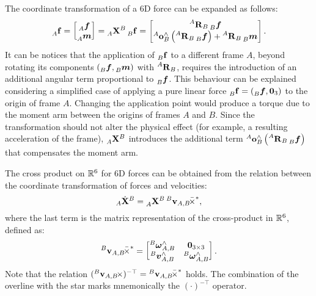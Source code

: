 \begin{addmargin}{0cm}
\begin{remark*}
%
The coordinate transformation of a 6D force can be expanded as follows:
%
\begin{equation*}
    \forcesix[A]
    = \begin{bmatrix}
        \forcelin[A] \\ \forceang[A]
    \end{bmatrix}
    = \transfor[A]^B \forcesix[B]
    = \begin{bmatrix}
        \rot[A]_B \forcelin[B] \\
        \ori[A]_B^\wedge \left( \rot[A]_B \forcelin[B] \right) + \rot[A]_B \forceang[B]
    \end{bmatrix}
    .
\end{equation*}
%
It can be notices that the application of $\forcesix[B]$ to a different frame $A$, beyond rotating its components $(\forcelin[B], \forceang[B])$ with $\rot[A]_B$, requires the introduction of an additional angular term proportional to $\forcelin[B]$.
This behaviour can be explained considering a simplified case of applying a pure linear force $\forcesix[B] = (\forcelin[B], \zeros_3)$ to the origin of frame $A$.
Changing the application point would produce a torque due to the moment arm between the origins of frames $A$ and $B$.
Since the transformation should not alter the physical effect (for example, a resulting acceleration of the frame), $\transfor[A]^B$ introduces the additional term $\ori[A]_B^\wedge \left( \rot[A]_B \forcelin[B] \right)$ that compensates the moment arm.
%
\end{remark*}

The cross product on $\realn^6$ for 6D forces can be obtained from the relation between the coordinate transformation of forces and velocities:
%
\begin{equation*}
    {}_A \dot{\mathbf{X}}^B = \transfor[A]^B \crossforsix[{\velsix[B]_{A,B}}]
    ,
\end{equation*}
%
where the last term is the matrix representation of the cross-product in $\realn^6$, defined as:
%
\begin{equation*}
    \crossforsix[{\velsix[B]_{A,B}}] =
    \begin{bmatrix}
        \velang[B]_{A,B}^\wedge & \zeros_{3\times3} \\
        \vellin[B]_{A, B}^\wedge & \velang[B]_{A,B}^\wedge
    \end{bmatrix}
    .
\end{equation*}
%
Note that the relation $(\crossvelsix[{\velsix[B]_{A,B}}])^{-\top} = \crossforsix[{\velsix[B]_{A,B}}]$ holds.
The combination of the overline with the star marks mnemonically the $(\cdot)^{-\top}$ operator.

\end{addmargin}

